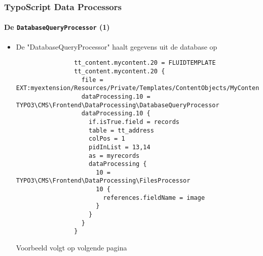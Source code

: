 \begin{frame}[fragile]
	\frametitle{TypoScript Data Processors}
	\framesubtitle{De \texttt{DatabaseQueryProcessor} (1)}

	\lstset{basicstyle=\tiny\ttfamily}

	\begin{itemize}

		\item De "DatabaseQueryProcessor" haalt gegevens uit de database op

			\begin{lstlisting}
				tt_content.mycontent.20 = FLUIDTEMPLATE
				tt_content.mycontent.20 {
				  file = EXT:myextension/Resources/Private/Templates/ContentObjects/MyContent.html
				  dataProcessing.10 = TYPO3\CMS\Frontend\DataProcessing\DatabaseQueryProcessor
				  dataProcessing.10 {
				    if.isTrue.field = records
				    table = tt_address
				    colPos = 1
				    pidInList = 13,14
				    as = myrecords
				    dataProcessing {
				      10 = TYPO3\CMS\Frontend\DataProcessing\FilesProcessor
				      10 {
				        references.fieldName = image
				      }
				    }
				  }
				}
			\end{lstlisting}


			\vspace{-0.2cm}
			\small
				Voorbeeld volgt op volgende pagina
			\normalsize

	\end{itemize}

\end{frame}


